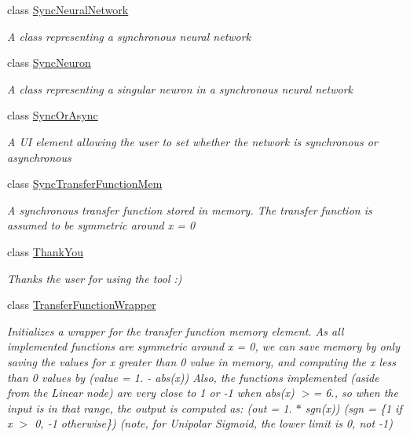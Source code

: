 \begin{DoxyCompactItemize}
class \hyperlink{class_n_n_gen_1_1_sync_neural_network}{Sync\+Neural\+Network}
\begin{DoxyCompactList}\small\item\em A class representing a synchronous neural network \end{DoxyCompactList}\item 
class \hyperlink{class_n_n_gen_1_1_sync_neuron}{Sync\+Neuron}
\begin{DoxyCompactList}\small\item\em A class representing a singular neuron in a synchronous neural network \end{DoxyCompactList}\item 
class \hyperlink{class_n_n_gen_1_1_sync_or_async}{Sync\+Or\+Async}
\begin{DoxyCompactList}\small\item\em A U\+I element allowing the user to set whether the network is synchronous or asynchronous \end{DoxyCompactList}\item 
class \hyperlink{class_n_n_gen_1_1_sync_transfer_function_mem}{Sync\+Transfer\+Function\+Mem}
\begin{DoxyCompactList}\small\item\em A synchronous transfer function stored in memory. The transfer function is assumed to be symmetric around x = 0 \end{DoxyCompactList}\item 
class \hyperlink{class_n_n_gen_1_1_thank_you}{Thank\+You}
\begin{DoxyCompactList}\small\item\em Thanks the user for using the tool \+:) \end{DoxyCompactList}\item 
class \hyperlink{class_n_n_gen_1_1_transfer_function_wrapper}{Transfer\+Function\+Wrapper}
\begin{DoxyCompactList}\small\item\em Initializes a wrapper for the transfer function memory element. As all implemented functions are symmetric around x = 0, we can save memory by only saving the values for x greater than 0 value in memory, and computing the x less than 0 values by (value = 1. -\/ abs(x)) Also, the functions implemented (aside from the Linear node) are very close to 1 or -\/1 when abs(x) $>$= 6., so when the input is in that range, the output is computed as\+: (out = 1. $\ast$ sgn(x)) (sgn = \{1 if x $>$ 0, -\/1 otherwise\}) (note, for Unipolar Sigmoid, the lower limit is 0, not -\/1) \end{DoxyCompactList}\item 

\end{DoxyCompactItemize}
